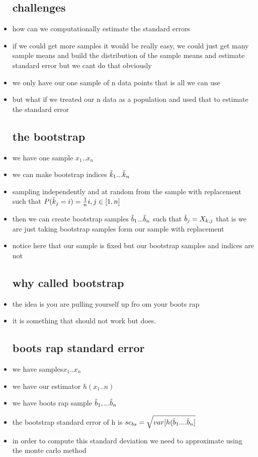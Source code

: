 \documentclass{article}
\begin{document}
\begin{itemize}
\subsection{challenges}
\item how can we computationally estimate the standard errors 
\item if we could get more samples it would be really easy, we could just get many sample means and build the distribution of the sample means and estimate standard error but we cant do that obviously
\item we only have our one sample of n data points that is all we can use 
\item but what if we treated our n data as a population and used that to estimate the standard error 
\subsection{the bootstrap}
\item we have one sample $x_1..x_n$
\item we can make bootstrap indices $\Tilde{k}_1...\Tilde{k}_{n}$  
\item sampling independently and at random from the sample with replacement such that $P(\Tilde{k}_{j}=i)=\frac{1}{n}i,j\in[1,n]$
\item then we can create bootstrap samples $\Tilde{b}_1...\Tilde{b}_n$ such that $\Tilde{b}_j=X_{k,j}$ that is we are just taking bootstrap samples form our sample with replacement 
\item notice here that our sample is fixed but our bootstrap samples and indices are not 
\subsection{why called bootstrap}
\item the idea is you are pulling yourself up fro om your boots rap
\item it is something that should not work but does. 
\subsection{boots rap standard error}
\item we have samples$x_1..x_n$
\item we have our estimator $h(x_1..n)$
\item we have boots rap sample $\Tilde{b}_1,...\Tilde{b}_n$
\item the bootstrap standard error of h is $se_{bs}=\sqrt{var[h(\Tilde{b}_1....\Tilde{b}_n]}$
\item in order to compute this standard deviation we need to approximate using the monte carlo method

\end{itemize}
\end{document}
